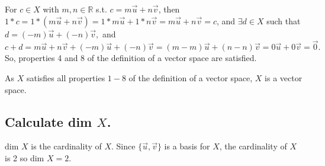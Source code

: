 \documentclass[11pt]{article} %
\begin{document}
For $c \in X$ with $m,n \in \mathbb{R}$ s.t. $c = m\vec{u} + n\vec{v}$, then $1*c = 1*( m\vec{u} + n\vec{v}) = 1*m\vec{u} + 1*n\vec{v} =  m\vec{u} + n\vec{v} = c$, and $\exists d \in X$ such that $d = (-m)\vec{u} + (-n)\vec{v},$ and $c+d =  m\vec{u} + n\vec{v} +  (-m)\vec{u} + (-n)\vec{v} =  (m-m)\vec{u} + (n-n)\vec{v} =  0\vec{u} + 0\vec{v} = \vec{0}.$ So, properties 4 and 8 of the definition of a vector space are satisfied. 

As $X$ satisfies all properties $1-8$ of the definition of a vector space, $X$ is a vector space.

\subsection{Calculate dim $X$.}
dim $X$ is the cardinality of $X$. Since $\{ \vec{u},\vec{v}\}$ is a basis for $X$, the cardinality of $X$ is 2 so dim $X = 2$.
\end{document}
